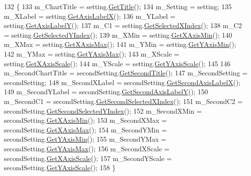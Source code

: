 \begin{DoxyCode}
132                                                                                 \{
133         m\_ChartTitle = setting.\hyperlink{class_data_attribute_ade9747a192ba22fe1020e874bff6a48c}{GetTitle}();
134         m\_Setting = setting;
135         m\_XLabel = setting.\hyperlink{class_data_attribute_aecb451704a87d77dd80dbad8a19099d1}{GetAxisLabelX}();
136         m\_YLabel = setting.\hyperlink{class_data_attribute_af5f68794cd0195d42135d5e48120ccc0}{GetAxisLabelY}();
137         m\_C1 = setting.\hyperlink{class_data_attribute_a0f4a54973bc44b0526f78bda945dc81b}{GetSelectedXIndex}();
138         m\_C2 = setting.\hyperlink{class_data_attribute_a82e7519853d9f470ea183dd0c39a03d6}{GetSelectedYIndex}();
139         m\_XMin = setting.\hyperlink{class_data_attribute_afa9da883abc4abad5f64c045de114c50}{GetXAxisMin}();
140         m\_XMax = setting.\hyperlink{class_data_attribute_ada370712422c7cbd21b7be4a0d88caf7}{GetXAxisMax}();
141         m\_YMin = setting.\hyperlink{class_data_attribute_af0786b4de674874c0bb8ca9dbe1519c6}{GetYAxisMin}();
142         m\_YMax = setting.\hyperlink{class_data_attribute_a81243eb8f7008e05e74b0f3571d2f08d}{GetYAxisMax}();
143         m\_XScale = setting.\hyperlink{class_data_attribute_a5a1de25600487aa958a19ce01151fea4}{GetXAxisScale}();
144         m\_YScale = setting.\hyperlink{class_data_attribute_a95259727ce91efc0e0eaa28487d944c5}{GetYAxisScale}();
145         
146         m\_SecondChartTitle = secondSetting.\hyperlink{class_data_attribute_a4079522c93025fce7569eaed585f4aeb}{GetSecondTitle}();
147         m\_SecondSetting = secondSetting;
148         m\_SecondXLabel = secondSetting.\hyperlink{class_data_attribute_a8ace4cb1fee9e2abeabe3efc9a190c8f}{GetSecondAxisLabelX}();
149         m\_SecondYLabel = secondSetting.\hyperlink{class_data_attribute_a6efb7e067317898feefbbf6bd472b998}{GetSecondAxisLabelY}();
150         m\_SecondC1 = secondSetting.\hyperlink{class_data_attribute_a7f501790eee650ddf9ac17c4f63a3995}{GetSecondSelectedXIndex}();
151         m\_SecondC2 = secondSetting.\hyperlink{class_data_attribute_a6f61ad05915f4aa31ad3dba00596da64}{GetSecondSelectedYIndex}();
152         m\_SecondXMin = secondSetting.\hyperlink{class_data_attribute_afa9da883abc4abad5f64c045de114c50}{GetXAxisMin}();
153         m\_SecondXMax = secondSetting.\hyperlink{class_data_attribute_ada370712422c7cbd21b7be4a0d88caf7}{GetXAxisMax}();
154         m\_SecondYMin = secondSetting.\hyperlink{class_data_attribute_af0786b4de674874c0bb8ca9dbe1519c6}{GetYAxisMin}();
155         m\_SecondYMax = secondSetting.\hyperlink{class_data_attribute_a81243eb8f7008e05e74b0f3571d2f08d}{GetYAxisMax}();
156         m\_SecondXScale = secondSetting.\hyperlink{class_data_attribute_a5a1de25600487aa958a19ce01151fea4}{GetXAxisScale}();
157         m\_SecondYScale = secondSetting.\hyperlink{class_data_attribute_a95259727ce91efc0e0eaa28487d944c5}{GetYAxisScale}();
158     \}
\end{DoxyCode}
